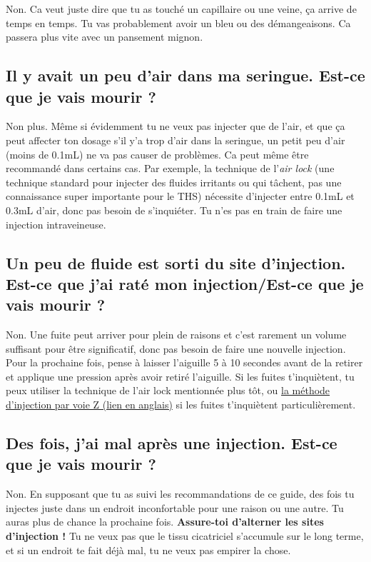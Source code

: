 \documentclass{article}
\begin{document}
Non. Ca veut juste dire que tu as touché un capillaire ou une veine, ça arrive de temps en temps. Tu vas probablement avoir un bleu ou des démangeaisons. Ca passera plus vite avec un pansement mignon.

\subsection{Il y avait un peu d'air dans ma seringue. Est-ce que je vais mourir ?}\label{7-7}

Non plus. Même si évidemment tu ne veux pas injecter que de l'air, et que ça peut affecter ton dosage s'il y'a trop d'air dans la seringue, un petit peu d'air (moins de 0.1mL) ne va pas causer de problèmes. Ca peut même être recommandé dans certains cas. Par exemple, la technique de l'\textit{air lock} (une technique standard pour injecter des fluides irritants ou qui tâchent, pas une connaissance super importante pour le THS) nécessite d'injecter entre 0.1mL et 0.3mL d'air, donc pas besoin de s'inquiéter. Tu n'es pas en train de faire une injection intraveineuse.

\subsection{Un peu de fluide est sorti du site d'injection. Est-ce que j'ai raté mon injection/Est-ce que je vais mourir ?}

Non. Une fuite peut arriver pour plein de raisons et c'est rarement un volume suffisant pour être significatif, donc pas besoin de faire une nouvelle injection. Pour la prochaine fois, pense à laisser l'aiguille 5 à 10 secondes avant de la retirer et applique une pression après avoir retiré l'aiguille. Si les fuites t'inquiètent, tu peux utiliser la technique de l'air lock mentionnée plus tôt, ou \href{https://www.nurse.com/nursing-resources/definitions/what-is-z-track-method/}{la méthode d'injection par voie Z (lien en anglais)} si les fuites t'inquiètent particulièrement.

\subsection{Des fois, j'ai mal après une injection. Est-ce que je vais mourir ?}

Non. En supposant que tu as suivi les recommandations de ce guide, des fois tu injectes juste dans un endroit inconfortable pour une raison ou une autre. Tu auras plus de chance la prochaine fois. \textbf{Assure-toi d'alterner les sites d'injection !} Tu ne veux pas que le tissu cicatriciel s'accumule sur le long terme, et si un endroit te fait déjà mal, tu ne veux pas empirer la chose.
\end{document}
